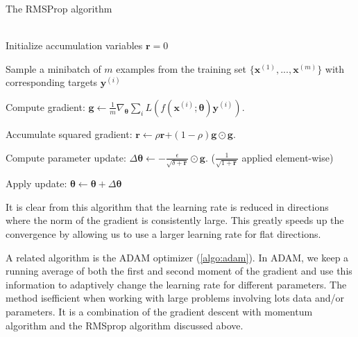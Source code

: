 \begin{algorithm}
\caption{The RMSProp algorithm}\label{alg:RMSProp}
    \label{algo:rmsprop}
\begin{algorithmic}
    
    \\
    Initialize accumulation variables $\boldsymbol{r}=0$
    

        Sample a minibatch of $m$ examples from the training set
        $\{\boldsymbol{x}^{(1)}, ..., \boldsymbol{x}^{(m)}\}$ with corresponding
        targets $\boldsymbol{y}^{(i)}$
    
        Compute gradient: $\boldsymbol{g} \gets
        \frac{1}{m}\nabla_{\boldsymbol\theta}
        \sum_{i}L(f(\boldsymbol{x}^{(i)};\boldsymbol{\theta})\boldsymbol{y}^{(i)})$.
        
        Accumulate squared gradient: $\boldsymbol{r} \gets
        \rho\boldsymbol{r}$+$(1-\rho)\boldsymbol{g}\odot\boldsymbol{g}$.

        Compute parameter update: 
        $\Delta\boldsymbol{\theta}\gets -\frac{\epsilon}{\sqrt{\delta+\boldsymbol{r}}}
        \odot\boldsymbol{g}$. ($\frac{1}{\sqrt{1+\boldsymbol{r}}}$ applied
        element-wise)
    
        Apply update: $\boldsymbol{\theta}\gets
        \boldsymbol\theta+\Delta\boldsymbol\theta$
    \EndWhile
\end{algorithmic}
\end{algorithm}
 It is clear from this algorithm that the learning rate is reduced in directions
 where the norm of the gradient is consistently large. This greatly speeds up
 the convergence by allowing us to use a larger learning rate for flat
 directions.

A related algorithm is the ADAM optimizer (\ref{algo:adam}). In ADAM, we keep a running average
of both the first and second moment of the gradient and use this information to
adaptively change the learning rate for different parameters. The method
isefficient when working with large problems involving lots data and/or
parameters. It is a combination of the gradient descent with momentum algorithm
and the RMSprop algorithm discussed above.

